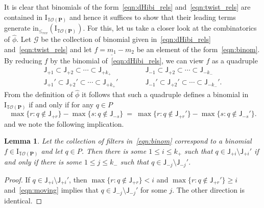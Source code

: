 \documentclass[11pt]{amsart}
\newtheorem{lem}[thm]{Lemma}
\theoremstyle{definition}
\begin{document}
It is clear that binomials of the form~\eqref{eqn:dHibi_rels}
and~\eqref{eqn:twist_rels} are contained in ${\mathrm{I}}_{{{\mathbb{T}}{\mathcal{O}({\mathbf{P}})}}}$ and hence it
suffices to show that their leading terms generate ${\textrm{in}_{\le_{rev}}}({\mathrm{I}}_{{{\mathbb{T}}{\mathcal{O}({\mathbf{P}})}}})$.  For
this, let us take a closer look at the combinatorics of $\hat \phi$. Let
$\mathcal G$ be the collection of binomial given in~\eqref{eqn:dHibi_rels}
and~\eqref{eqn:twist_rels} and let $f = \underline{m_1} - m_2$ be an element
of the form~\eqref{eqn:binom}. By reducing $f$ by the binomial
of~\eqref{eqn:dHibi_rels}, we can view $f$ as a quadruple
\begin{equation}\label{eqn:quad}
\begin{aligned}
    {\mathsf{J}}_{+1} \subset {\mathsf{J}}_{+2} \subset \cdots \subset {\mathsf{J}}_{+k_+} &\quad\qquad
    {\mathsf{J}}_{-1} \subset {\mathsf{J}}_{+2} \subset \cdots \subset {\mathsf{J}}_{-k_-}\\
    {\mathsf{J}}_{+1}' \subset {\mathsf{J}}_{+2}' \subset \cdots \subset {\mathsf{J}}_{+k_+}' &\quad\qquad
    {\mathsf{J}}_{-1}' \subset {\mathsf{J}}_{+2}' \subset \cdots \subset
    {\mathsf{J}}_{-k_-}'.
\end{aligned}
\end{equation}
From the definition of $\hat \phi$ it follows that such a quadruple defines a
binomial in ${\mathrm{I}}_{{{\mathbb{T}}{\mathcal{O}({\mathbf{P}})}}}$ if and only if for any $q \in {P}$
\begin{equation}\label{eqn:moving}
        \max\{r:q \notin {\mathsf{J}}_{+r} \} - \max\{s : q \notin {\mathsf{J}}_{-s} \}
        \ = \ \max\{ r : q \notin {\mathsf{J}}_{+r}' \} - \max\{ s : q \notin
        {\mathsf{J}}_{-s}'\}.
\end{equation}
and we note the following implication.
\begin{lem}\label{lem:moving}
    Let the collection of filters in~\eqref{eqn:binom} correspond to a
    binomial $f \in {\mathrm{I}}_{{{\mathbb{T}}{\mathcal{O}({\mathbf{P}})}}}$ and let $q \in {P}$. Then there is some $1
    \le i \le k_+$ such that $q \in {\mathsf{J}}_{+i} \setminus {\mathsf{J}}_{+i}'$ if
    and only if there is some $1 \le j \le k_-$ such that 
    $q \in {\mathsf{J}}_{-j} \setminus {\mathsf{J}}_{-j}'$.
\end{lem}
\begin{proof}
    If $q \in {\mathsf{J}}_{+i} \setminus {\mathsf{J}}_{+i}'$, then $\max\{r:q \notin
    {\mathsf{J}}_{+r} \} < i$ and $\max\{r:q \notin {\mathsf{J}}_{+r}' \} \ge i$
    and~\eqref{eqn:moving} implies that $q \in {\mathsf{J}}_{-j} \setminus
    {\mathsf{J}}_{-j}'$ for some $j$. The other direction is identical.
\end{proof}
\end{document}
